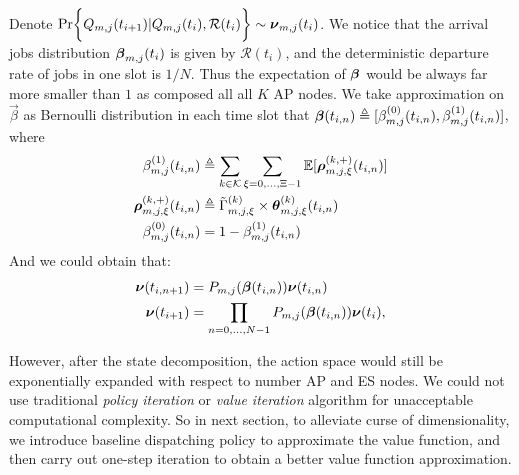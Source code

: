 Denote $\Pr\Brace{ Q_{m,j}(t_{i+1})|Q_{m,j}(t_{i}), \mathcal{R}(t_{i}) } \sim \vecG{\nu}_{m,j}(t_i)$. We notice that the arrival jobs distribution $\boldsymbol{\beta}_{m,j}(t_{i})$ is given by $\mathcal{R}(t_{i})$, and the deterministic departure rate of jobs in one slot is $1/N$. Thus the expectation of $\boldsymbol{\beta}$ would be always far more smaller than $1$ as composed all all $K$ AP nodes. We take approximation on $\vec{\beta}$ as Bernoulli distribution in each time slot that $\boldsymbol{\beta}(t_{i,n}) \triangleq [\beta^{(0)}_{m,j}(t_{i,n}), \beta^{(1)}_{m,j}(t_{i,n})]$, where
\begin{align}
    \beta^{(1)}_{m,j}(t_{i,n}) &\triangleq \sum_{k\in\mathcal{K}} \sum_{\xi=0,\dots,\Xi-1} \mathbb{E}[\boldsymbol{\rho}^{(k,+)}_{m,j,\xi}(t_{i,n})]
    \label{eqn_0}
    \\
    \boldsymbol{\rho}^{(k,+)}_{m,j,\xi}(t_{i,n}) &\triangleq \tilde{\Gamma}^{(k)}_{m,j,\xi} \times \boldsymbol{\theta}^{(k)}_{m,j,\xi}(t_{i,n})
    \\
    \beta^{(0)}_{m,j}(t_{i,n}) &= 1-\beta^{(1)}_{m,j}(t_{i,n})
\end{align}
And we could obtain that:
\begin{align}
    \boldsymbol{\nu}(t_{i,n+1}) &= P_{m,j}(\boldsymbol{\beta}(t_{i,n})) \boldsymbol{\nu}(t_{i,n})
    \\
    \boldsymbol{\nu}(t_{i+1}) &= \prod_{n=0,\dots,N-1} P_{m,j}(\boldsymbol{\beta}(t_{i,n})) \boldsymbol{\nu}(t_{i}),
    \label{eqn_4}
\end{align}

However, after the state decomposition, the action space would still be exponentially expanded with respect to number AP and ES nodes. We could not use traditional \emph{policy iteration} or \emph{value iteration} algorithm \cite{sutton1998introduction} for unacceptable computational complexity.
So in next section, to alleviate curse of dimensionality, we introduce baseline dispatching policy to approximate the value function, and then carry out one-step iteration to obtain a better value function approximation.
